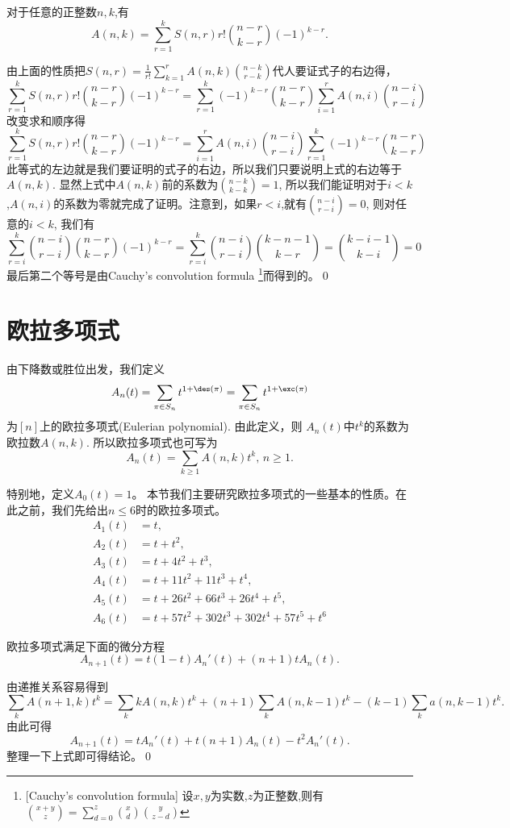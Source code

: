\begin{thm}
对于任意的正整数$n,k$,有
\begin{equation}
A(n,k)=\sum_{r=1}^{k}S(n,r)r!{n-r\choose k-r}(-1)^{k-r}.
\end{equation}
\end{thm}

由上面的性质把$S(n,r)=\frac{1}{r!}\sum_{k=1}^{r}A(n,k){n-k\choose
r-k}$代人要证式子的右边得，
$$\sum_{r=1}^{k}S(n,r)r!{n-r\choose k-r}(-1)^{k-r}=\sum_{r=1}^{k}(-1)^{k-r}{n-r\choose k-r}\sum_{i=1}^{r}A(n,i){n-i\choose
r-i}$$ 改变求和顺序得
$$\sum_{r=1}^{k}S(n,r)r!{n-r\choose k-r}(-1)^{k-r}=\sum_{i=1}^{r}A(n,i){n-i\choose r-i}\sum_{r=1}^{k}(-1)^{k-r}{n-r\choose
k-r}$$
此等式的左边就是我们要证明的式子的右边，所以我们只要说明上式的右边等于$A(n,k)$.
显然上式中$A(n,k)$前的系数为${n-k\choose k-k}=1$,
所以我们能证明对于$i<k$,$A(n,i)$的系数为零就完成了证明。注意到，如果$r<i$,就有${n-i\choose
r-i}=0$, 则对任意的$i<k$, 我们有
$$\sum_{r=i}^{k}{n-i\choose r-i}{n-r\choose k-r}(-1)^{k-r}=\sum_{r=i}^{k}{n-i\choose r-i}{k-n-1\choose k-r}={k-i-1\choose k-i}=0$$
最后第二个等号是由Cauchy's convolution formula \footnote{[Cauchy's
convolution formula] 设$x,y$为实数,$z$为正整数,则有${x+y\choose
z}=\sum_{d=0}^{z}{x\choose d}{y\choose z-d}$}而得到的。\qed






\section{欧拉多项式}
由下降数或胜位出发，我们定义
$$A_n(t)=\sum_{\pi\in S_n}t^{1+\des(\pi)}=
\sum_{\pi\in S_n}t^{1+\exc(\pi)}$$ 为$[n]$上的欧拉多项式(Eulerian
polynomial). 由此定义，则 $A_n(t)$中$t^{k}$的系数为欧拉数$A(n,k)$.
所以欧拉多项式也可写为 \[A_n(t)=\sum_{k\geq 1}A(n,k)t^k,\,n\geq1.\]

特别地，定义$A_0(t)=1$。
本节我们主要研究欧拉多项式的一些基本的性质。在此之前，我们先给出$n\leq
6$时的欧拉多项式。
\begin{align*}
A_1(t) &=t, \\[5pt]
A_2(t) &=t+t^2, \\[5pt]
A_3(t) &=t+4t^2+t^3, \\[5pt]
A_4(t) &=t+11t^2+11t^3+t^4,\\[5pt]
A_5(t) &=t+26t^2+66t^3+26t^4+t^5, \\[5pt]
A_6(t) &=t+57t^2+302t^3+302t^4+57t^5+t^6
\end{align*}

\begin{prop}\label{epd}
欧拉多项式满足下面的微分方程
\begin{equation}
A_{n+1}(t)=t(1-t)A_n'(t)+(n+1)tA_n(t).
\end{equation}
\end{prop}
\pf 由递推关系容易得到
\[
\sum_{k}A(n+1,k)t^k=\sum_{k}kA(n,k)t^k+(n+1)\sum_kA(n,k-1)t^k-(k-1)\sum_{k}a(n,k-1)t^k.\]
由此可得
\[A_{n+1}(t)=tA_n'(t)+t(n+1)A_n(t)-t^2A_n'(t).\]
整理一下上式即可得结论。\qed


